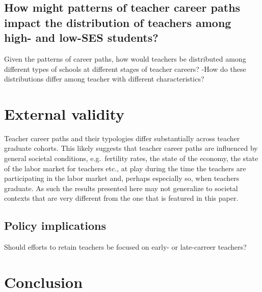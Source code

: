 \documentclass[
]{article}
\begin{document}
\hypertarget{how-might-patterns-of-teacher-career-paths-impact-the-distribution-of-teachers-among-high--and-low-ses-students}{%
\subsection{How might patterns of teacher career paths impact the distribution of teachers among high- and low-SES students?}\label{how-might-patterns-of-teacher-career-paths-impact-the-distribution-of-teachers-among-high--and-low-ses-students}}

Given the patterns of career paths, how would teachers be distributed among different types of schools at different stages of teacher careers?
-How do these distributions differ among teacher with different characteristics?

\hypertarget{external-validity}{%
\section{External validity}\label{external-validity}}

Teacher career paths and their typologies differ substantially across teacher graduate cohorts. This likely suggests that teacher career paths are influenced by general societal conditions, e.g.~fertility rates, the state of the economy, the state of the labor market for teachers etc., at play during the time the teachers are participating in the labor market and, perhaps especially so, when teachers graduate. As such the results presented here may not generalize to societal contexts that are very different from the one that is featured in this paper.

\hypertarget{policy-implications}{%
\subsection{Policy implications}\label{policy-implications}}

Should efforts to retain teachers be focused on early- or late-carreer teachers?

\hypertarget{conclusion}{%
\section{Conclusion}\label{conclusion}}
\end{document}
